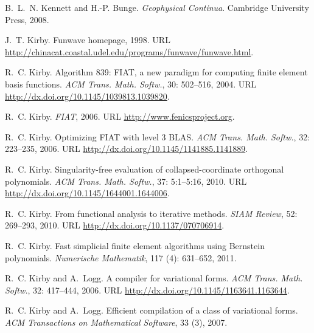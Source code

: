 \begin{thebibliography}{467}
B.~L.~N. Kennett and H.-P. Bunge.
\newblock \emph{Geophysical Continua}.
\newblock Cambridge University Press, 2008.

J.~T. Kirby.
\newblock Funwave homepage, 1998.
\newblock URL
  \url{http://chinacat.coastal.udel.edu/programs/funwave/funwave.html}.

R.~C. Kirby.
\newblock Algorithm 839: {FIAT}, a new paradigm for computing finite element
  basis functions.
\newblock \emph{ACM Trans. Math. Softw.}, 30: 502--516, 2004.
\newblock URL \url{http://dx.doi.org/10.1145/1039813.1039820}.

R.~C. Kirby.
\newblock \emph{{FIAT}}, 2006{}.
\newblock URL \url{http://www.fenicsproject.org}.

R.~C. Kirby.
\newblock Optimizing {FIAT} with level 3 {BLAS}.
\newblock \emph{ACM Trans. Math. Softw.}, 32: 223--235,
  2006{}.
\newblock URL \url{http://dx.doi.org/10.1145/1141885.1141889}.

R.~C. Kirby.
\newblock Singularity-free evaluation of collapsed-coordinate orthogonal
  polynomials.
\newblock \emph{ACM Trans. Math. Softw.}, 37: 5:1--5:16,
  2010{}.
\newblock URL \url{http://dx.doi.org/10.1145/1644001.1644006}.

R.~C. Kirby.
\newblock From functional analysis to iterative methods.
\newblock \emph{SIAM Review}, 52: 269--293, 2010{}.
\newblock URL \url{http://dx.doi.org/10.1137/070706914}.

R.~C. Kirby.
\newblock Fast simplicial finite element algorithms using {B}ernstein
  polynomials.
\newblock \emph{Numerische Mathematik}, 117 (4): 631--652,
  2011.

R.~C. Kirby and A.~Logg.
\newblock A compiler for variational forms.
\newblock \emph{ACM Trans. Math. Softw.}, 32: 417--444, 2006.
\newblock URL \url{http://dx.doi.org/10.1145/1163641.1163644}.

R.~C. Kirby and A.~Logg.
\newblock Efficient compilation of a class of variational forms.
\newblock \emph{ACM Transactions on Mathematical Software}, 33 (3),
  2007.


\end{thebibliography}
